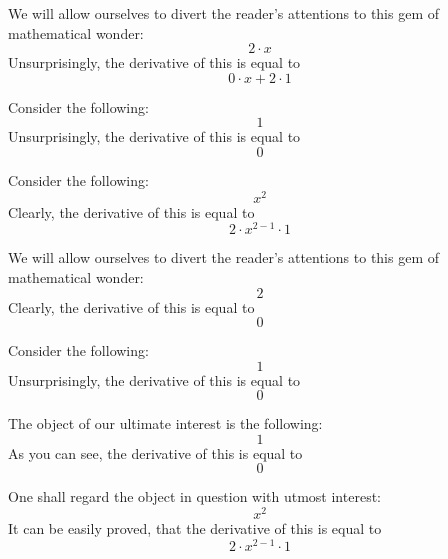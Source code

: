 \documentclass{article}
\begin{document}
We will allow ourselves to divert the reader's attentions to this gem of mathematical wonder:
\begin{equation}
2 \cdot x 
\end{equation}
Unsurprisingly, the derivative of this is equal to
\begin{equation}
0 \cdot x + 2 \cdot 1 
\end{equation}

Consider the following:
\begin{equation}
1 
\end{equation}
Unsurprisingly, the derivative of this is equal to
\begin{equation}
0 
\end{equation}

Consider the following:
\begin{equation}
x ^{2 } 
\end{equation}
Clearly, the derivative of this is equal to
\begin{equation}
2 \cdot x ^{2 - 1 } \cdot 1 
\end{equation}

We will allow ourselves to divert the reader's attentions to this gem of mathematical wonder:
\begin{equation}
2 
\end{equation}
Clearly, the derivative of this is equal to
\begin{equation}
0 
\end{equation}

Consider the following:
\begin{equation}
1 
\end{equation}
Unsurprisingly, the derivative of this is equal to
\begin{equation}
0 
\end{equation}

The object of our ultimate interest is the following:
\begin{equation}
1 
\end{equation}
As you can see, the derivative of this is equal to
\begin{equation}
0 
\end{equation}

One shall regard the object in question with utmost interest:
\begin{equation}
x ^{2 } 
\end{equation}
It can be easily proved, that the derivative of this is equal to
\begin{equation}
2 \cdot x ^{2 - 1 } \cdot 1 
\end{equation}
\end{document}
